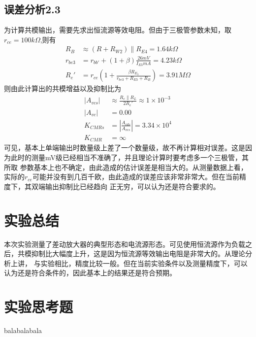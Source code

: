 \documentclass[a4paper,11pt,UTF8]{ctexart}
\begin{document}
\subsection{误差分析2.3}
为计算共模输出，需要先求出恒流源等效电阻。但由于三极管参数未知，取$r_{ce}=100k\Omega$,则有
\begin{equation}
  \begin{aligned}
    R_B&\approx(R+R_{W2})\parallel R_{E4}=1.64k\Omega\\
    r_{be3}&=r_{bb'}+(1+\beta)\frac{26mV}{I_{E3}mA}=4.23k\Omega\\
    R_e'&=r_{ce}(1+\frac{\beta R_{E_3}}{r_{be3}+R_{E3}+R_{B}})=3.91M\Omega
  \end{aligned}
\end{equation}
则由此计算出的共模增益以及抑制比为
\begin{equation}
  \begin{aligned}
    \left | A_{vcs}\right |&\approx\frac{R_c\parallel R_L}{2R_e'}\approx1\times10^{-3}\\
    \left | A_{vc}\right |&=0.00\\
    K_{CMRs}&=\left |\frac{A_{vds}}{A_{vcs}}\right |=3.34\times10^{4}\\
    K_{CMR}&=\infty
  \end{aligned}
\end{equation}
可见，基本上单端输出时数量级上差了一个数量级，故不再计算相对误差。这是因为此时的测量mV级已经相当不准确了，并且理论计算时要考虑多一个三极管，其所取
参数基本上也不确定，由此造成的估计误差是相当大的。从测量数据上看，实际的$r_{ce}$可能并没有到几百千欧，由此造成的误差应该非常非常大。但在当前精度下，其双端输出抑制比已经趋向
正无穷，可以认为还是符合要求的。
\section{实验总结}
本次实验测量了差动放大器的典型形态和电流源形态。可见使用恒流源作为负载之后，共模抑制比大幅度上升，这是因为恒流源等效输出电阻是非常大的。从理论分析上讲，
与实验相比，精度比较一般。但在当前实验条件以及测量精度下，可以认为还是符合条件的，因此基本上的结果还是符合预期。
\section{实验思考题}
balabalabala
\end{document}
